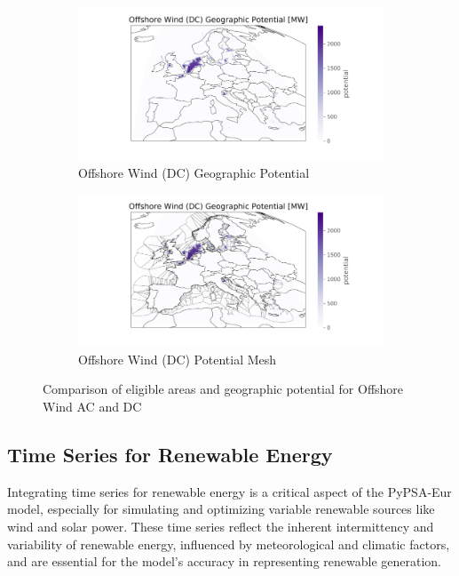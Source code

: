 \begin{figure}[htp]
    \begin{subfigure}{0.45\textwidth}
        \includegraphics[width=\textwidth, trim=3.5cm 0cm 2.5cm 0cm, clip]{Figure/offshore_wind_DC_potential.png}
        \caption{Offshore Wind (DC) Geographic Potential}
    \end{subfigure}
    \hfill
    \begin{subfigure}{0.45\textwidth}
        \includegraphics[width=\textwidth, trim=3.5cm 0cm 2.5cm 0cm, clip]{Figure/offshore_wind_DC_potential_mesh.png}
        \caption{Offshore Wind (DC) Potential Mesh}
    \end{subfigure}
    
    \caption{Comparison of eligible areas and geographic potential for Offshore Wind AC and DC}
\end{figure}







\subsection{Time Series for Renewable Energy}
Integrating time series for renewable energy is a critical aspect of the PyPSA-Eur model, especially for simulating and optimizing variable renewable sources like wind and solar power. These time series reflect the inherent intermittency and variability of renewable energy, influenced by meteorological and climatic factors, and are essential for the model's accuracy in representing renewable generation.\\

